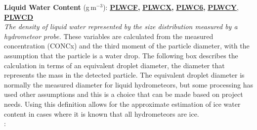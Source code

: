 \begin{hangparagraphs}
\textbf{Liquid Water Content }(g\,m\textbf{$^{-3}$}):\textbf{ }\textbf{\uline{PLWCF}}\textbf{,
}\textbf{\uline{PLWCX}}\textbf{,
}\textbf{\uline{PLWC6}}\textbf{,
}\textbf{\uline{PLWCY}}, \textbf{\uline{PLWCD}}\\
\emph{The density of liquid
water represented by the size distribution measured by a hydrometeor
probe.}
These variables are calculated from the measured concentration (CONCx)
and the third moment of the particle diameter, with the assumption
that the particle is a water drop. The following box describes the
calculation in terms of an equivalent droplet diameter,
the diameter that represents the mass in the detected particle. The
equivalent droplet diameter is normally the measured diameter for
liquid hydrometeors, but some processing has used other assumptions
and this is a choice that can be made based on project needs. Using
this definition allows for the approximate estimation of ice
water content in cases where it is known that all hydrometeors are
ice. \\
:\\
\\


\end{hangparagraphs}

